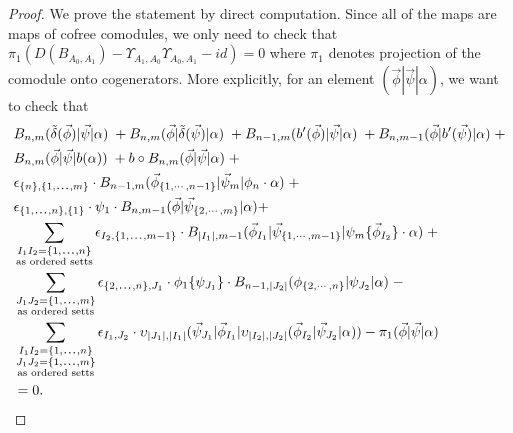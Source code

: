 \begin{proof}
We prove the statement by direct computation. 
Since all of the maps are maps of cofree comodules, 
we only need to check that $\pi_1(D(B_{A_0,A_1}) - 
\Upsilon_{A_1,A_0}\Upsilon_{A_0,A_1} - id) = 0$ 
where $\pi_1$ denotes projection of the comodule 
onto cogenerators. More explicitly, for an element 
$(\vec{\phi}|\vec{\psi}|\alpha)$, we want to check that
\begin{equation} \label{eq:upsilon_homotopy}
\begin{aligned}
&B_{n, m} ( \tilde{\delta}(\vec{\phi}) | \vec{\psi} | \alpha ) \; + 
B_{n, m} ( \vec{\phi} | \tilde{\delta}(\vec{\psi}) | \alpha ) \; + 
B_{n-1, m} ( b^\prime(\vec{\phi}) | \vec{\psi} | \alpha ) \; + 
B_{n, m-1} ( \vec{\phi} | b^\prime(\vec{\psi}) | \alpha ) \; + \\
&B_{n, m} ( \vec{\phi} | \vec{\psi} | b(\alpha) ) \; + 
b \circ B_{n, m} ( \vec{\phi} | \vec{\psi} | \alpha ) \; + \\
%
& \epsilon_{\{n\},\{1,\smdots,m\}}\cdot
B_{n-1, m}(\vec{\phi}_{\{1,\cdots, n-1\}} |\vec{\psi}_{m} | \phi_{n} \cdot \alpha) \; + \\
%
& \epsilon_{\{1,\smdots,n\},\{1\}}\cdot
\psi_1 \cdot B_{n,m-1} ( \vec{\phi} | \vec{\psi}_{\{2,\cdots, m\}} | \alpha)  + \\ 
%
& \sum \limits_{\substack{
    I_1I_2 = \{1,\smdots,n\}\\
    \textrm{as ordered setts}}}
\epsilon_{I_2,\{1,\smdots,m-1\}}\cdot
B_{|I_1|, m-1}(\vec{\phi}_{I_1} | \vec{\psi}_{\{1,\cdots, m-1\}} | \psi_{m} \{\vec{\phi}_{I_2}\}\cdot \alpha ) \; + \\
%
& \sum \limits_{\substack{
    J_1J_2 = \{1,\smdots,m\}\\
    \textrm{as ordered setts}}}
\epsilon_{\{2,\smdots,n\},J_1}\cdot
\phi_1 \{ \psi_{J_1}\} \cdot B_{n-1, |J_2|}(\phi_{\{2,\cdots , n\}} | \psi_{J_2} | \alpha ) \; - \\
%
& \sum \limits_{\substack{
    I_1I_2 = \{1,\smdots,n\}\\
    J_1J_2 = \{1,\smdots,m\}\\
    \textrm{as ordered setts}}}
\epsilon_{I_1,J_2}\cdot
\upsilon_{|J_1|, |I_1|} (\vec{\psi}_{J_1} | \vec{\phi}_{I_1} | \upsilon_{|I_2|, |J_2|} (\vec{\phi}_{I_2} | \vec{\psi}_{J_2} | \alpha ))  - \pi_1(\vec{\phi} | \vec{\psi} | \alpha) \\
&= 0.
\end{aligned}
\end{equation}


\end{proof}

